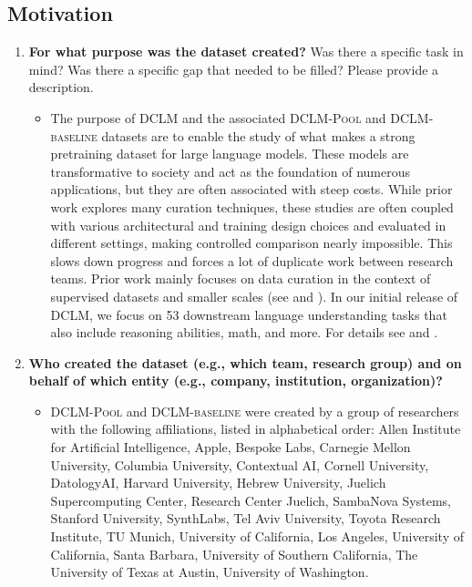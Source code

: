 \documentclass{article}
\newcommand{\dclm}{\textsc{DCLM}\xspace}
\newcommand{\rawpool}{\textsc{DCLM-Pool}\xspace}
\newcommand{\hqpool}{\textsc{DCLM-baseline}\xspace}
\begin{document}
\subsection{Motivation}

\begin{enumerate}[label=Q\arabic*]

\item \textbf{For what purpose was the dataset created?} Was there a specific task in mind? Was there a specific gap that needed to be filled? Please provide a description.

\begin{itemize}
\item The purpose of \dclm and the associated \rawpool and \hqpool datasets are to enable the study of what makes a strong pretraining dataset for large language models. These models are transformative to society and act as the foundation of numerous applications, but they are often associated with steep costs.
While prior work explores many curation techniques, these studies are often coupled with various architectural and training design choices and evaluated in different settings, making controlled comparison nearly impossible.
This slows down progress and forces a lot of duplicate work between research teams. Prior work mainly focuses on data curation in the context of supervised datasets and smaller scales (see  and ).
In our initial release of \dclm, we focus on 53 downstream language understanding tasks that also include reasoning abilities, math, and more. For details see  and .

\end{itemize}

\item \textbf{Who created the dataset (e.g., which team, research group) and on behalf of which entity (e.g., company, institution, organization)?}

\begin{itemize}
\item \rawpool and \hqpool were created by a group of researchers with the following affiliations, listed in alphabetical order: Allen Institute for Artificial Intelligence, Apple, Bespoke Labs, Carnegie Mellon University, Columbia University, Contextual AI, Cornell University, DatologyAI, Harvard University, Hebrew University, Juelich Supercomputing Center, Research Center Juelich, SambaNova Systems, Stanford University, SynthLabs, Tel Aviv University, Toyota Research Institute, TU Munich, University of California, Los Angeles, University of California, Santa Barbara, University of Southern California, The University of Texas at Austin, University of Washington.
\end{itemize}


\end{enumerate}
\end{document}
